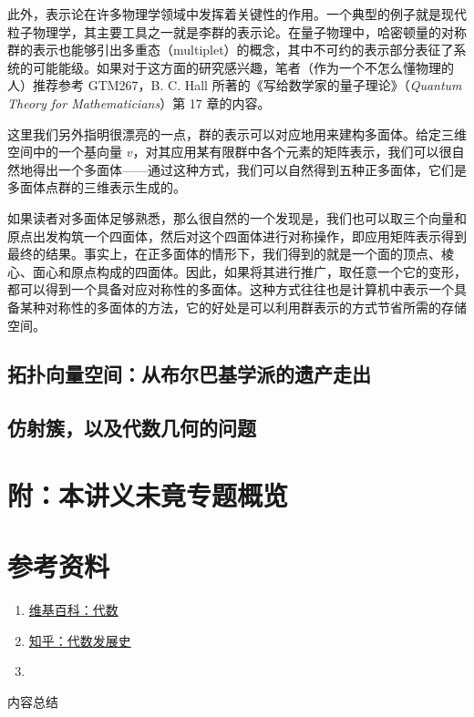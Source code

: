 此外，表示论在许多物理学领域中发挥着关键性的作用。一个典型的例子就是现代粒子物理学，其主要工具之一就是李群的表示论。在量子物理中，哈密顿量的对称群的表示也能够引出多重态（multiplet）的概念，其中不可约的表示部分表征了系统的可能能级。如果对于这方面的研究感兴趣，笔者（作为一个不怎么懂物理的人）推荐参考 GTM267，B. C. Hall 所著的《写给数学家的量子理论》（\textit{Quantum Theory for Mathematicians}）第 17 章的内容。

这里我们另外指明很漂亮的一点，群的表示可以对应地用来建构多面体。给定三维空间中的一个基向量 $v$，对其应用某有限群中各个元素的矩阵表示，我们可以很自然地得出一个多面体——通过这种方式，我们可以自然得到五种正多面体，它们是多面体点群的三维表示生成的。

如果读者对多面体足够熟悉，那么很自然的一个发现是，我们也可以取三个向量和原点出发构筑一个四面体，然后对这个四面体进行对称操作，即应用矩阵表示得到最终的结果。事实上，在正多面体的情形下，我们得到的就是一个面的顶点、棱心、面心和原点构成的四面体。因此，如果将其进行推广，取任意一个它的变形，都可以得到一个具备对应对称性的多面体。这种方式往往也是计算机中表示一个具备某种对称性的多面体的方法，它的好处是可以利用群表示的方式节省所需的存储空间。

\subsection{拓扑向量空间：从布尔巴基学派的遗产走出}

\subsection{仿射簇，以及代数几何的问题}

\section*{附：本讲义未竟专题概览}


\section*{参考资料}
\begin{enumerate}
    \item \href{https://zh.wikipedia.org/wiki/%E4%BB%A3%E6%95%B0}{维基百科：代数}
    \item \href{https://zhuanlan.zhihu.com/p/574858845}{知乎：代数发展史}
    \item 
\end{enumerate}
\vspace{2ex}
\centerline{\heiti \Large 内容总结}

